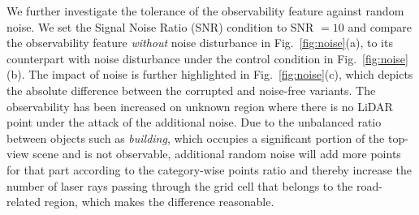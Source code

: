 \documentclass[lettersize,journal]{IEEEtran}
\begin{document}
We further investigate the tolerance of the observability feature against random noise. We set the Signal Noise Ratio (SNR) condition to SNR $= 10$ and compare the observability feature \textit{without} noise disturbance  in Fig.~\ref{fig:noise}(a), to its counterpart with noise disturbance under the control condition in Fig.~\ref{fig:noise}(b). The impact of noise is further highlighted in Fig.~\ref{fig:noise}(c), which depicts the absolute difference between the corrupted and noise-free variants. The observability has been increased on unknown region where there is no LiDAR point under the attack of the additional noise. Due to the unbalanced ratio between objects such as \emph{building}, which occupies a significant portion of the top-view scene and is not observable, additional random noise will add more points for that part according to the category-wise points ratio and thereby increase the number of laser rays passing through the grid cell that belongs to the road-related region, which makes the difference reasonable.
\end{document}
